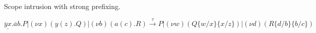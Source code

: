 \begin{example} Scope intrusion with strong prefixing.
  \begin{center}
    $\underline{\overline{y}x}.\overline{a}b.P|(\nu x)(y(z).Q)|(\nu b)(a(c).R) \xrightarrow{\tau} P|(\nu w)(Q\{w/x\}\{x/z\})|(\nu d)(R\{d/b\}\{b/c\})$
  \end{center}
\end{example}


% 
% 


